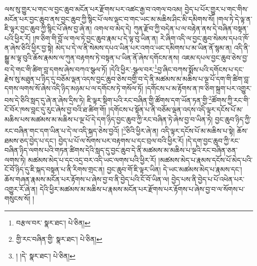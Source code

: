 ལས་སུ་གྱུར་པ་གང་ལ་བྱང་ཆུབ་མངོན་པར་རྫོགས་པར་འཚང་རྒྱ་བ་འགལ་བའམ། བྱེད་པ་པོར་གྱུར་པ་གང་གིས་མངོན་པར་བྱང་ཆུབ་ནས་བྱང་ཆུབ་ཀྱི་སྙིང་པོ་ལས་ལྡང་བ་གང་ཡང་མ་མཆིས་ཤིང་མི་དམིགས་སོ། །གལ་ཏེ་དེ་ལྟ་ན་ཇི་ལྟར་བྱང་ཆུབ་ཀྱི་སྙིང་པོ་ཞེས་བྱ་ཞེ་ན། འགལ་བ་མེད་དེ། ཀུན་རྫོབ་ཀྱི་བདེན་པ་ལ་བརྟེན་ནས་དེ་བཞིན་བསྟན་པའི་ཕྱིར་རོ། །ཁ་ཅིག་གི་བློ་ལ་གལ་ཏེ་བྱང་ཆུབ་རྣམ་པ་དེ་ལྟ་བུ་ཡིན་ན། རེ་ཞིག་འདི་ལ་བྱང་ཆུབ་སེམས་དཔའ་ཁོ་ན་ཞེས་ཅིའི་ཕྱིར་བྱ་སྟེ། མེད་པ་དེ་ལ་ནི་སེམས་དཔའ་ཡིན་པར་འགའ་ཡང་དམིགས་པ་མ་ཡིན་ནོ་སྙམ་ན། འདི་ནི་སྒྱུ་མ་ལྟ་བུའི་ཆོས་རྣམས་ལ་ཀུན་བརྟགས་ཏེ་བསྟན་པ་ཡིན་ནོ་ཞེས་དགོངས་ནས། འཇམ་དཔལ་བྱང་ཆུབ་ཅེས་བྱ་བ་དེ་གང་གི་ཚིག་བླ་དགས་ཞེས་བཀའ་སྩལ་ཏོ། །དེའི་ཕྱིར་:སྩལ་བར་\footnote{བརྩལ་བར་  སྣར་ཐང་།  པེ་ཅིན། }བྱ་ཞིང་བཀས་སྨོས་པའི་དགོངས་པ་དང་རྗེས་སུ་མཐུན་པ་ཉིད་དུ་བཅོམ་ལྡན་འདས་བྱང་ཆུབ་ཅེས་བགྱི་བ་དེ་ནི་མཚམས་མ་མཆིས་པ་ལྔ་པོ་དག་གི་ཚིག་བླ་དགས་ལགས་སོ་ཞེས་འདི་ཉིད་མཉམ་པ་ལ་དགོངས་ཏེ་གསོལ་ཏོ། །དགོངས་པ་མ་རྟོགས་ན་ཁ་ཅིག་སྐྲག་པར་འགྱུར་བས་དེ་ཅིའི་སླད་དུ་ཞེ་ན་ཞེས་དྲིས་ཏེ། ཇི་ལྟར་སྡིག་པའི་རང་བཞིན་གྱི་ཚོགས་དག་ཡོན་ཏན་གྱི་\footnote{གྱི་རང་བཞིན་གྱི་  སྣར་ཐང་།  པེ་ཅིན། }ཚོགས་ཀྱི་རང་གི་ངོ་བོར་ཁས་བླང་དུ་རུང་ཞེས་བྱ་བའི་ཐ་ཚིག་གོ། །དགོངས་པ་སྟོན་པ་ནི་བཅོམ་ལྡན་འདས་འདི་ལྟར་དངོས་པོ་མ་མཆིས་པས་མཚམས་མ་མཆིས་པ་ལྔ་པོ་དེ་དག་ཉིད་བྱང་ཆུབ་ཀྱི་རང་བཞིན་ཏེ་ཞེས་བྱ་བ་ཡིན་ཏེ། བྱང་ཆུབ་ཉིད་ཀྱི་རང་བཞིན་གང་དག་ཡིན་པ་དེ་ལ་འདི་སྐད་ཅེས་བྱའོ། །\footnote{། །དེ་  སྣར་ཐང་།  པེ་ཅིན། }ཅིའི་ཕྱིར་ཞེ་ན། འདི་ལྟར་དངོས་པོ་མ་མཆིས་པ་སྟེ། ཆོས་ཐམས་ཅད་བྱེད་པ་དང་། བྱེད་པ་པོ་ལ་སོགས་པར་བརྟགས་པ་དང་བྲལ་བའི་ཕྱིར་རོ། །དེ་དག་བྱང་ཆུབ་ཀྱི་རང་བཞིན་ཉིད་ལགས་པའི་གཏན་ཚིགས་དེའི་སླད་དུ་བྱང་ཆུབ་དེ་ནི་མཚམས་མ་མཆིས་པ་ལྔའི་རང་བཞིན་ཅན་ལགས་ཏེ། མཚམས་མེད་པ་དང་འདྲ་བར་འདི་ཡང་ལགས་པའི་ཕྱིར་རོ། །མཚམས་མེད་པ་རྣམས་དངོས་པོ་མེད་པའི་ངོ་བོ་ཉིད་དུ་ཇི་སྐད་བསྟན་པ་ནི་རིགས་གྲང་ན། བྱང་ཆུབ་གོ་ཇི་ལྟར་ཡིན། དེ་ཡང་མཚམས་མེད་པ་རྣམས་དང་། ཆོས་གཞན་རྣམས་མངོན་པར་རྟོགས་པ་ཞེས་བྱ་བ་ནི་བྱེད་པའི་ངོ་བོ་ཡིན་ལ། བྱེད་པས་ནི་བྱེད་པ་པོ་འཕེན་པར་འགྱུར་རོ་ཞེ་ན། དེའི་ཕྱིར་མཚམས་མ་མཆིས་པ་རྣམས་མངོན་པར་རྫོགས་པར་རྟོགས་པ་ཞེས་བྱ་བ་ལ་སོགས་པ་གསུངས་སོ། །
